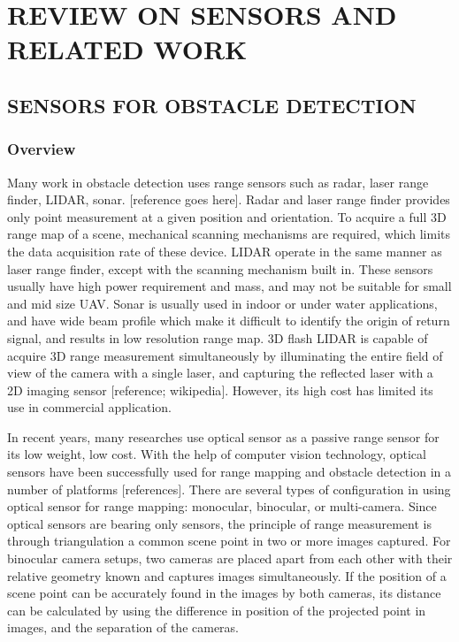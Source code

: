\chapter{REVIEW ON SENSORS AND RELATED WORK}\label{ch:Review}

\section{SENSORS FOR OBSTACLE DETECTION}\label{sec:sensor}

\subsection{Overview}\label{sec:SensorOverview}

Many work in obstacle detection uses range sensors such as radar, laser 
range finder, LIDAR, sonar. $[$reference goes here$]$. Radar and laser 
range finder provides only point measurement at a given position and 
orientation. To acquire a full 3D range map of a scene, mechanical 
scanning mechanisms are required, which limits the data acquisition rate 
of these device. LIDAR operate in the same manner as laser range finder, 
except with the scanning mechanism built in. These sensors usually have 
high power requirement and mass, and may not be suitable for small and 
mid size UAV. Sonar is usually used in indoor or under water 
applications, and have wide beam profile which make it difficult to 
identify the origin of return signal, and results in low resolution 
range map. 3D flash LIDAR is capable of acquire 3D range measurement 
simultaneously by illuminating the entire field of view of the camera 
with a single laser, and capturing the reflected laser with a 2D imaging 
sensor $[$reference; wikipedia$]$. However, its high cost has limited 
its use in commercial application.

In recent years, many researches use optical sensor as a passive range 
sensor for its low weight, low cost. With the help of computer vision 
technology, optical sensors have been successfully used for range 
mapping and obstacle detection in a number of platforms 
$[$references$]$. There are several types of configuration in using 
optical sensor for range mapping: monocular, binocular, or multi-camera. 
Since optical sensors are bearing only sensors, the principle of range 
measurement is through triangulation a common scene point in two or more 
images captured. For binocular camera setups, two cameras are placed 
apart from each other with their relative geometry known and captures 
images simultaneously. If the position of a scene point can be 
accurately found in the images by both cameras, its distance can be 
calculated by using the difference in position of the projected point in 
images, and the separation of the cameras. 

